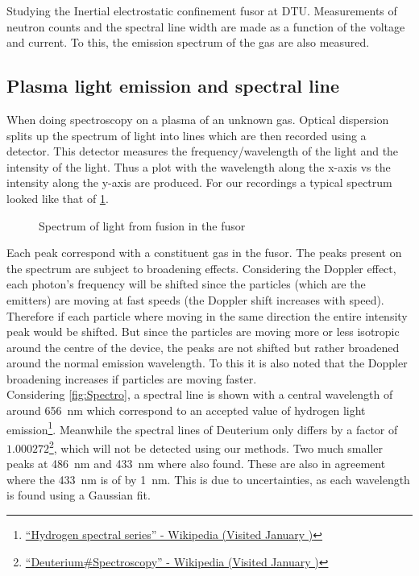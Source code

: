 Studying the Inertial electrostatic confinement fusor at DTU. Measurements of neutron counts and the spectral line width are made as a function of the voltage and current. To this, the emission spectrum of the gas are also measured.
\subsection{Plasma light emission and spectral line}
When doing spectroscopy on a plasma of an unknown gas. Optical dispersion splits up the spectrum of light into lines which are then recorded using a detector. This detector measures the frequency/wavelength of the light and the intensity of the light. Thus a plot with the wavelength along the x-axis vs the intensity along the y-axis are produced. For our recordings a typical spectrum looked like that of \cref{SPEC}.
\begin{figure}[H]
	\centering
	\caption{Spectrum of light from fusion in the fusor}
	\label{SPEC}
\end{figure}
Each peak correspond with a constituent gas in the fusor.
The peaks present on the spectrum are subject to broadening effects. Considering the Doppler effect, each photon's frequency will be shifted since the particles (which are the emitters) are moving at fast speeds (the Doppler shift increases with speed). Therefore if each particle where moving in the same direction the entire intensity peak would be shifted. But since the particles are moving more or less isotropic around the centre of the device, the peaks are not shifted but rather broadened around the normal emission wavelength. To this it is also noted that the Doppler broadening increases if particles are moving faster.\\
Considering \cref{fig:Spectro}, a spectral line is shown with a central wavelength of around \SI{656}{\nano\meter} which correspond to an accepted value of hydrogen light emission\footnote{\href{https://en.wikipedia.org/wiki/Hydrogen_spectral_series}{``Hydrogen spectral series'' - Wikipedia (Visited January )}}. Meanwhile the spectral lines of Deuterium only differs by a factor of $1.000272$\footnote{\href{https://en.wikipedia.org/wiki/Deuterium#Spectroscopy}{``Deuterium\#Spectroscopy'' - Wikipedia (Visited January )}}, which will not be detected using our methods. Two much smaller peaks at \SI{486}{\nano\meter} and \SI{433}{\nano\meter} where also found. These are also in agreement where the \SI{433}{\nano\meter} is of by \SI{1}{\nano\meter}. This is due to uncertainties, as each wavelength is found using a Gaussian fit.\\
